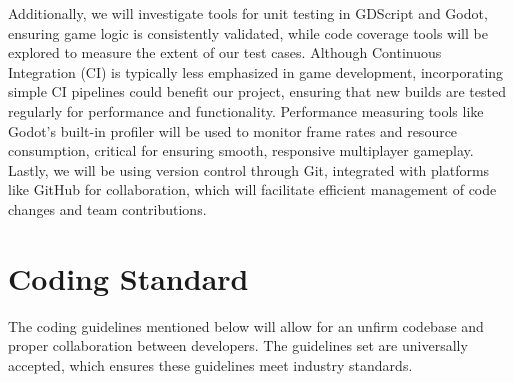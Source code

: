 \documentclass{article}
\begin{document}
Additionally, we will investigate tools for unit testing in GDScript and Godot, ensuring game logic is consistently validated, while code coverage tools will be explored to measure the extent of our test cases. Although Continuous Integration (CI) is typically less emphasized in game development, incorporating simple CI pipelines could benefit our project, ensuring that new builds are tested regularly for performance and functionality. Performance measuring tools like Godot's built-in profiler will be used to monitor frame rates and resource consumption, critical for ensuring smooth, responsive multiplayer gameplay. Lastly, we will be using version control through Git, integrated with platforms like GitHub for collaboration, which will facilitate efficient management of code changes and team contributions. \\

\section{Coding Standard}


The coding guidelines mentioned below will allow for an unfirm codebase and proper collaboration between developers. The guidelines set are universally accepted, which ensures these guidelines meet industry standards.
\end{document}
